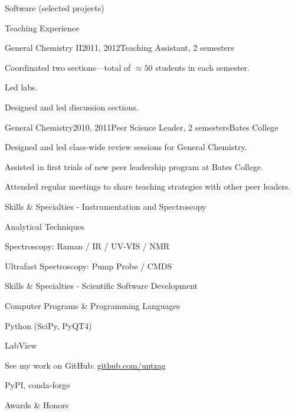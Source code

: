 \documentclass{resume}  %
\begin{document}
\begin{rSection}{Software (selected projects)}
\begin{rSection}{Teaching Experience}
\begin{rSubsection}{General Chemistry II}{2011, 2012}{Teaching Assistant, 2 semesters}{}
\item Coordinated two sections---total of $\approx50$ students in each semester.
\item Led labs.
\item Designed and led discussion sections.
\end{rSubsection}

\begin{rSubsection}{General Chemistry}{2010, 2011}{Peer Science Leader, 2 semesters}{Bates College}
\item Designed and led class-wide review sessions for General Chemistry.
\item Assisted in first trials of new peer leadership program at Bates College.
\item Attended regular meetings to share teaching strategies with other peer leaders.
\end{rSubsection}

\end{rSection}

\begin{rSection}{Skills \& Specialties - Instrumentation and Spectroscopy}
	
\begin{rSubsection}{Analytical Techniques}{}{}{}
\item Spectroscopy: Raman / IR / UV-VIS / NMR
\item Ultrafast Spectroscopy: Pump Probe / CMDS 
\end{rSubsection}

\end{rSection}

\begin{rSection}{Skills \& Specialties - Scientific Software Development}
  
\begin{rSubsection}{Computer Programs \& Programming Languages}{}{}{}
\item Python (SciPy, PyQT4)
\item LabView
\item See my work on GitHub: \href{https://github.com/untzag}{github.com/untzag}
\item PyPI, conda-forge
\end{rSubsection}

\end{rSection}

\begin{rSection}{Awards \& Honors}


\end{rSection}
\end{rSection}
\end{document}
